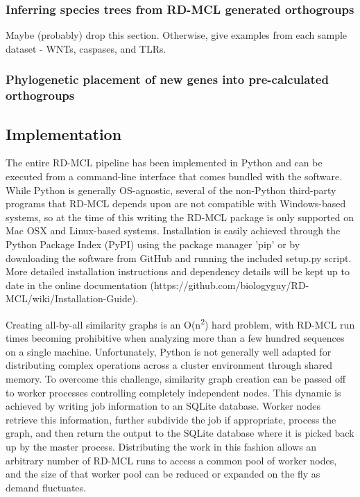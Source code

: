 \documentclass[twocolumn]{bmcart}  %
\begin{document}
\subsubsection{Inferring species trees from RD-MCL generated orthogroups}
Maybe (probably) drop this section.
Otherwise, give examples from each sample dataset - WNTs, caspases, and TLRs.


\subsubsection{Phylogenetic placement of new genes into pre-calculated orthogroups}


\subsection{Implementation}\label{subsec:implementation}
The entire RD-MCL pipeline has been implemented in Python and can be executed from a command-line interface that comes bundled with the software.
While Python is generally OS-agnostic, several of the non-Python third-party programs that RD-MCL depends upon are not compatible with Windows-based systems, so at the time of this writing the RD-MCL package is only supported on Mac OSX and Linux-based systems.
Installation is easily achieved through the Python Package Index (PyPI) using the package manager 'pip' or by downloading the software from GitHub and running the included setup.py script.
More detailed installation instructions and dependency details will be kept up to date in the online documentation (https://github.com/biologyguy/RD-MCL/wiki/Installation-Guide).

Creating all-by-all similarity graphs is an O(n\textsuperscript{2}) hard problem, with RD-MCL run times becoming prohibitive when analyzing more than a few hundred sequences on a single machine.
Unfortunately, Python is not generally well adapted for distributing complex operations across a cluster environment through shared memory.
To overcome this challenge, similarity graph creation can be passed off to worker processes controlling completely independent nodes.
This dynamic is achieved by writing job information to an SQLite database.
Worker nodes retrieve this information, further subdivide the job if appropriate, process the graph, and then return the output to the SQLite database where it is picked back up by the master process.
Distributing the work in this fashion allows an arbitrary number of RD-MCL runs to access a common pool of worker nodes, and the size of that worker pool can be reduced or expanded on the fly as demand fluctuates.
\end{document}
